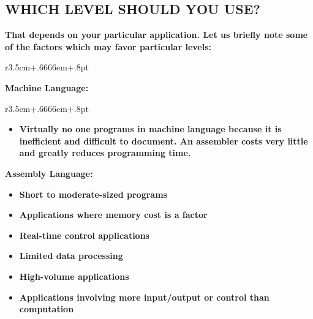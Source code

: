 \documentclass{book}
\begin{document}
\subsection*{WHICH LEVEL SHOULD YOU USE?}

\textbf{That depends on your particular application. Let us briefly note some of the factors
which may favor particular levels:}

\begin{wrapfigure}{r}{3.5cm+.6666em+.8pt}
\end{wrapfigure}
\textbf{Machine Language:}
\begin{wrapfigure}{r}{3.5cm+.6666em+.8pt}
\end{wrapfigure}
\begin{itemize}
\item\textbf{Virtually no one programs in machine language because it is inefficient and difficult to document. An assembler costs very little and greatly reduces programming time.}
\end{itemize}

\textbf{Assembly Language:}
\begin{itemize}
\item\textbf{Short to moderate-sized programs}
\item\textbf{Applications where memory cost is a factor}
\item\textbf{Real-time control applications}
\item\textbf{Limited data processing}
\item\textbf{High-volume applications}
\item\textbf{Applications involving more input/output or control than computation}
\end{itemize}
\end{document}
